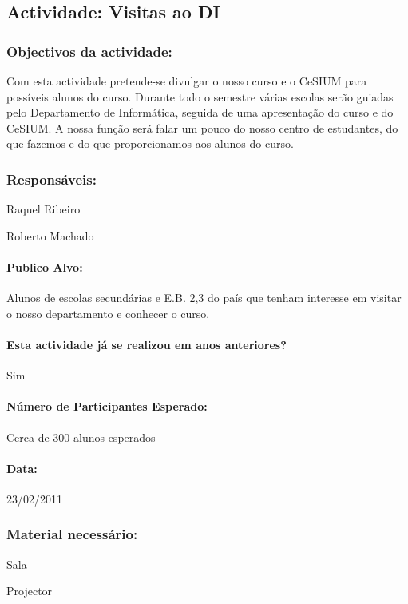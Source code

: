 \subsection{Actividade: Visitas ao DI} %

\subsubsection*{Objectivos da actividade:}
Com esta actividade pretende-se divulgar o nosso curso e o CeSIUM para possíveis alunos do curso. Durante todo o semestre várias escolas serão guiadas pelo Departamento de Informática, seguida de uma apresentação do curso e do CeSIUM. A nossa função será falar um pouco do nosso centro de estudantes, do que fazemos e do que proporcionamos aos alunos do curso.

\subsubsection*{Responsáveis:}
\begin{itemizedash}
	\item{Raquel Ribeiro}
	\item{Roberto Machado}
\end{itemizedash}

\paragraph{Publico Alvo: }
Alunos de escolas secundárias e E.B. 2,3 do país que tenham interesse  em visitar o nosso departamento e conhecer o curso.

\paragraph{Esta actividade já se realizou em anos anteriores?}
Sim

\paragraph{Número de Participantes Esperado:}
Cerca de 300 alunos esperados

\paragraph{Data:} 23/02/2011

\subsubsection*{Material necessário:}
\begin{itemizedash}
	\item{Sala}
	\item{Projector}
\end{itemizedash}

